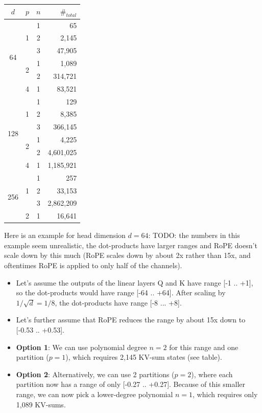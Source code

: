 \documentclass{article}
\numberwithin{equation}{section} %
\begin{document}
\begin{tabular}{c|c|c|r}
  $d$                  & $p$              & $n$ & $\#_{total}$ \\ \hline
  \multirow{6}{*}{64}  & \multirow{3}{*}{1} & 1 &        65 \\
                       &                    & 2 &     2,145 \\
                       &                    & 3 &    47,905 \\ \cline{2-4}
                       & \multirow{2}{*}{2} & 1 &     1,089 \\
                       &                    & 2 &   314,721 \\ \cline{2-4}
                       &                 4  & 1 &    83,521 \\ \hline
  \multirow{6}{*}{128} & \multirow{3}{*}{1} & 1 &       129 \\
                       &                    & 2 &     8,385 \\
                       &                    & 3 &   366,145 \\ \cline{2-4}
                       & \multirow{2}{*}{2} & 1 &     4,225 \\
                       &                    & 2 & 4,601,025 \\ \cline{2-4}
                       &                 4  & 1 & 1,185,921 \\ \hline
  \multirow{4}{*}{256} & \multirow{3}{*}{1} & 1 &       257 \\
                       &                    & 2 &    33,153 \\
                       &                    & 3 & 2,862,209 \\ \cline{2-4}
                       &                 2  & 1 &    16,641 \\ \hline
\end{tabular}
\endgroup

Here is an example for head dimension $d = 64$: TODO: the numbers in this example seem unrealistic, the dot-products have larger ranges and RoPE doesn't scale down by this much (RoPE scales down by about 2x rather than 15x, and oftentimes RoPE is applied to only half of the channels).
\begin{itemize}[topsep=-1pt, itemsep=-1pt]
  \item Let’s assume the outputs of the linear layers Q and K have range [-1 .. +1], so the dot-products would have range [-64 .. +64]. After scaling by $1/ \sqrt{d} = 1/8$, the dot-products have range [-8 ... +8].
  \item Let’s further assume that RoPE reduces the range by about 15x down to [-0.53 .. +0.53].
  \item \textbf{Option 1}: We can use polynomial degree $n = 2$ for this range and one partition ($p = 1$), which requires 2,145 KV-sum states (see table).
  \item \textbf{Option 2}: Alternatively, we can use 2 partitions ($p = 2$), where each partition now has a range of only [-0.27 .. +0.27]. Because of this smaller range, we can now pick a lower-degree polynomial $n = 1$, which requires only 1,089 KV-sums.
\end{itemize}
\end{document}
